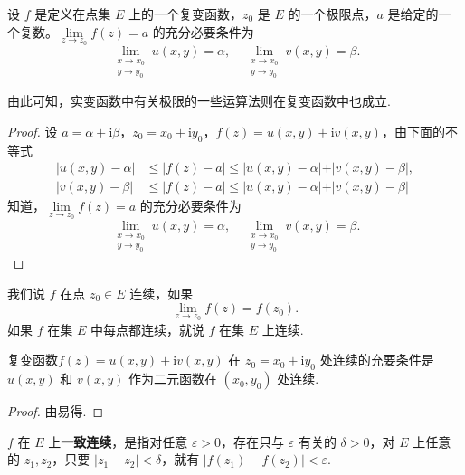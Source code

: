 \documentclass[../../main.tex]{subfiles}
\begin{document}
\begin{theorem}\label{theorem:复变函数极限存在充要条件1.7}
设 $f$ 是定义在点集 $E$ 上的一个复变函数，$z_0$ 是 $E$ 的一个极限点，$a$ 是给定的一个复数。$\lim\limits_{z \to z_0} f(z) = a$ 的充分必要条件为
\[
\lim_{\substack{x \to x_0 \\ y \to y_0}} u(x, y) = \alpha, \quad \lim_{\substack{x \to x_0 \\ y \to y_0}} v(x, y) = \beta.
\]
\end{theorem}
\begin{note}
由此可知，实变函数中有关极限的一些运算法则在复变函数中也成立.
\end{note}
\begin{proof}
设 $a = \alpha + \mathrm{i}\beta$，$z_0 = x_0 + \mathrm{i}y_0$，$f(z) = u(x, y) + \mathrm{i}v(x, y)$，由下面的不等式
\begin{align*}
\vert u(x, y) - \alpha \vert &\leqslant \vert f(z) - a \vert \leqslant \vert u(x, y) - \alpha \vert + \vert v(x, y) - \beta \vert, \\
\vert v(x, y) - \beta \vert &\leqslant \vert f(z) - a \vert \leqslant \vert u(x, y) - \alpha \vert + \vert v(x, y) - \beta \vert 
\end{align*}
知道，$\lim\limits_{z \to z_0} f(z) = a$ 的充分必要条件为
\[
\lim_{\substack{x \to x_0 \\ y \to y_0}} u(x, y) = \alpha, \quad \lim_{\substack{x \to x_0 \\ y \to y_0}} v(x, y) = \beta.
\]
\end{proof}

\begin{definition}
我们说 $f$ 在点 $z_0 \in E$ 连续，如果
\[
\lim_{z \to z_0} f(z) = f(z_0).
\]
如果 $f$ 在集 $E$ 中每点都连续，就说 $f$ 在集 $E$ 上连续.
\end{definition}

\begin{theorem}
复变函数$f(z) = u(x, y) + \mathrm{i}v(x, y)$ 在 $z_0 = x_0 + \mathrm{i}y_0$ 处连续的充要条件是 $u(x, y)$ 和 $v(x, y)$ 作为二元函数在 $(x_0, y_0)$ 处连续.
\end{theorem}
\begin{proof}
由易得.
\end{proof}

\begin{definition}
$f$ 在 $E$ 上\textbf{一致连续}，是指对任意 $\varepsilon > 0$，存在只与 $\varepsilon$ 有关的 $\delta > 0$，对 $E$ 上任意的 $z_1, z_2$，只要 $|z_1 - z_2| < \delta$，就有 $|f(z_1) - f(z_2)| < \varepsilon$.
\end{definition}
\end{document}
